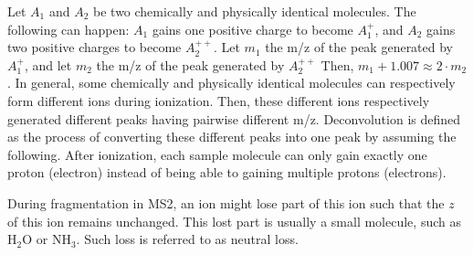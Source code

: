 Let \(A_1\) and \(A_2\) be two chemically and physically identical molecules.
The following can happen: \(A_1\) gains one positive charge to become \(A_1^+\), and \(A_2\) gains two positive charges to become \(A_2^{++}\).
Let \(m_1\) the \gls{m/z} of the peak generated by \(A_1^+\), and let \(m_2\) the \gls{m/z} of the peak generated by \(A_2^{++}\)
Then, \(m_1 + 1.007 \approx 2\cdot m_2\).
In general, some chemically and physically identical molecules can respectively form different ions during ionization.
Then, these different ions respectively generated different peaks having pairwise different \gls{m/z}.
Deconvolution is defined as the process of converting these different peaks into one peak by assuming the following.
After ionization, each sample molecule can only gain exactly one proton (electron) instead of being able to gaining multiple protons (electrons).

During fragmentation in \gls{MS2}, an ion might lose part of this ion such that the \(z\) of this ion remains unchanged.
This lost part is usually a small molecule, such as \(\text{H}_2\text{O}\) or \(\text{N}\text{H}_3\).
Such loss is referred to as neutral loss. 

